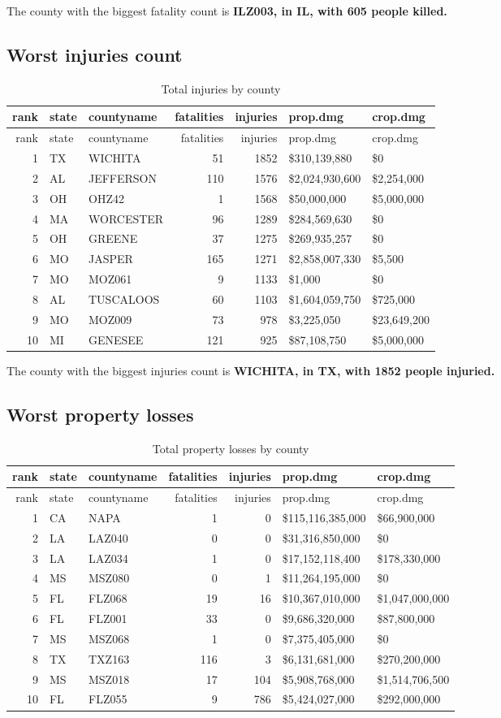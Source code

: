 \documentclass[]{article}
\begin{document}
The county with the biggest fatality count is \textbf{ILZ003, in IL,
with 605 people killed.}

\subsection{Worst injuries count}\label{worst-injuries-count}

\begin{longtable}[]{@{}rllrrll@{}}
\caption{Total injuries by county}\tabularnewline
\toprule
rank & state & countyname & fatalities & injuries & prop.dmg &
crop.dmg\tabularnewline
\midrule
\endfirsthead
\toprule
rank & state & countyname & fatalities & injuries & prop.dmg &
crop.dmg\tabularnewline
\midrule
\endhead
1 & TX & WICHITA & 51 & 1852 & \$310,139,880 & \$0\tabularnewline
2 & AL & JEFFERSON & 110 & 1576 & \$2,024,930,600 &
\$2,254,000\tabularnewline
3 & OH & OHZ42 & 1 & 1568 & \$50,000,000 & \$5,000,000\tabularnewline
4 & MA & WORCESTER & 96 & 1289 & \$284,569,630 & \$0\tabularnewline
5 & OH & GREENE & 37 & 1275 & \$269,935,257 & \$0\tabularnewline
6 & MO & JASPER & 165 & 1271 & \$2,858,007,330 & \$5,500\tabularnewline
7 & MO & MOZ061 & 9 & 1133 & \$1,000 & \$0\tabularnewline
8 & AL & TUSCALOOS & 60 & 1103 & \$1,604,059,750 &
\$725,000\tabularnewline
9 & MO & MOZ009 & 73 & 978 & \$3,225,050 & \$23,649,200\tabularnewline
10 & MI & GENESEE & 121 & 925 & \$87,108,750 &
\$5,000,000\tabularnewline
\bottomrule
\end{longtable}

The county with the biggest injuries count is \textbf{WICHITA, in TX,
with 1852 people injuried.}

\subsection{Worst property losses}\label{worst-property-losses}

\begin{longtable}[]{@{}rllrrll@{}}
\caption{Total property losses by county}\tabularnewline
\toprule
rank & state & countyname & fatalities & injuries & prop.dmg &
crop.dmg\tabularnewline
\midrule
\endfirsthead
\toprule
rank & state & countyname & fatalities & injuries & prop.dmg &
crop.dmg\tabularnewline
\midrule
\endhead
1 & CA & NAPA & 1 & 0 & \$115,116,385,000 & \$66,900,000\tabularnewline
2 & LA & LAZ040 & 0 & 0 & \$31,316,850,000 & \$0\tabularnewline
3 & LA & LAZ034 & 1 & 0 & \$17,152,118,400 &
\$178,330,000\tabularnewline
4 & MS & MSZ080 & 0 & 1 & \$11,264,195,000 & \$0\tabularnewline
5 & FL & FLZ068 & 19 & 16 & \$10,367,010,000 &
\$1,047,000,000\tabularnewline
6 & FL & FLZ001 & 33 & 0 & \$9,686,320,000 & \$87,800,000\tabularnewline
7 & MS & MSZ068 & 1 & 0 & \$7,375,405,000 & \$0\tabularnewline
8 & TX & TXZ163 & 116 & 3 & \$6,131,681,000 &
\$270,200,000\tabularnewline
9 & MS & MSZ018 & 17 & 104 & \$5,908,768,000 &
\$1,514,706,500\tabularnewline
10 & FL & FLZ055 & 9 & 786 & \$5,424,027,000 &
\$292,000,000\tabularnewline
\bottomrule
\end{longtable}
\end{document}
